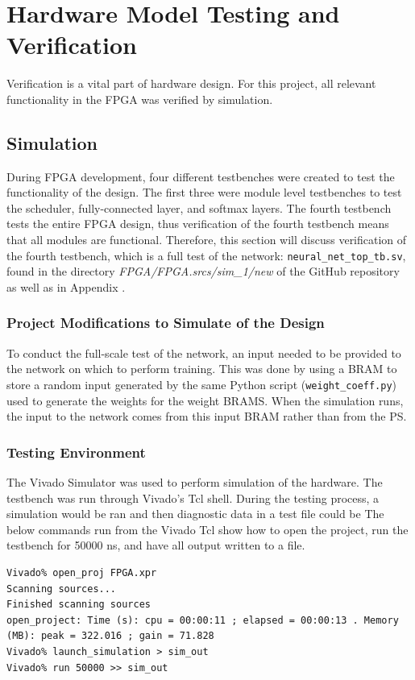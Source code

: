 \chapter{Hardware Model Testing and Verification}\label{hw-model-testing}
Verification is a vital part of hardware design. For this project, all relevant functionality in the FPGA was verified by simulation.
\section{Simulation}
During FPGA development, four different testbenches were created to test the functionality of the design. The first three were module level testbenches to test the scheduler, fully-connected layer, and softmax layers. The fourth testbench tests the entire FPGA design, thus verification of the fourth testbench means that all modules are functional. Therefore, this section will discuss verification of the fourth testbench, which is a full test of the network: \texttt{neural\_net\_top\_tb.sv}, found in the directory \textit{FPGA/FPGA.srcs/sim\_1/new} of the GitHub repository as well as in Appendix .

\subsection{Project Modifications to Simulate of the Design}
To conduct the full-scale test of the network, an input needed to be provided to the network on which to perform training. This was done by using a BRAM to store a random input generated by the same Python script (\texttt{weight\_coeff.py}) used to generate the weights for the weight BRAMS. When the simulation runs, the input to the network comes from this input BRAM rather than from the PS.

\subsection{Testing Environment}
The Vivado Simulator was used to perform simulation of the hardware. The testbench was run through Vivado's Tcl shell. During the testing process, a simulation would be ran and then diagnostic data in a test file could be  The below commands run from the Vivado Tcl show how to open the project, run the testbench for 50000 ns, and have all output written to a file.
\begin{lstlisting}
Vivado% open_proj FPGA.xpr
Scanning sources...
Finished scanning sources
open_project: Time (s): cpu = 00:00:11 ; elapsed = 00:00:13 . Memory (MB): peak = 322.016 ; gain = 71.828
Vivado% launch_simulation > sim_out
Vivado% run 50000 >> sim_out
\end{lstlisting}

